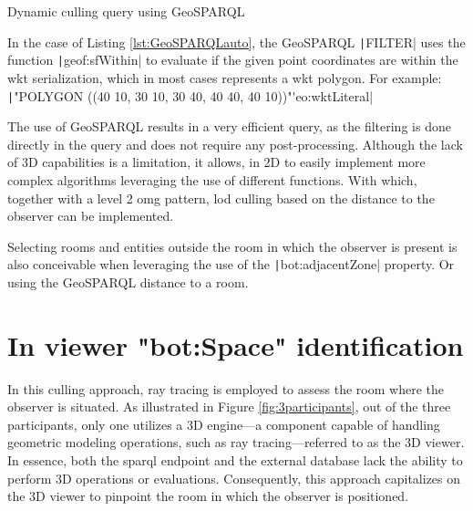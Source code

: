 \begin{listing}[H]
    \inputminted{sparql}{dynamicQueries/inSitu/query.rq}
    \vspace{-0.7cm}
    \caption{Dynamic culling query using GeoSPARQL}
    \label{lst:GeoSPARQLauto}
\end{listing}

In the case of Listing \ref{lst:GeoSPARQLauto}, the GeoSPARQL \texttt|FILTER| uses the function \texttt|geof:sfWithin| to evaluate if the given point coordinates are within the \ac{wkt} serialization, which in most cases represents a \ac{wkt} polygon. For example:\\
\texttt|"POLYGON ((40 10, 30 10, 30 40, 40 40, 40 10))"^^geo:wktLiteral|

The use of GeoSPARQL results in a very efficient query, as the filtering is done directly in the query and does not require any post-processing. Although the lack of 3D capabilities is a limitation, it allows, in 2D to easily implement more complex algorithms leveraging the use of different functions. With which, together with a level 2 \ac{omg} pattern, \ac{lod} culling based on the distance to the observer can be implemented.

Selecting rooms and entities outside the room in which the observer is present is also conceivable when leveraging the use of the \texttt|bot:adjacentZone| property. Or using the GeoSPARQL distance to a room.

\section{In viewer "bot:Space" identification} \label{sec:inViewer}
In this culling approach, ray tracing is employed to assess the room where the observer is situated. As illustrated in Figure \ref{fig:3participants}, out of the three participants, only one utilizes a 3D engine—a component capable of handling geometric modeling operations, such as ray tracing—referred to as the 3D viewer. In essence, both the \ac{sparql} endpoint and the external database lack the ability to perform 3D operations or evaluations. Consequently, this approach capitalizes on the 3D viewer to pinpoint the room in which the observer is positioned.

